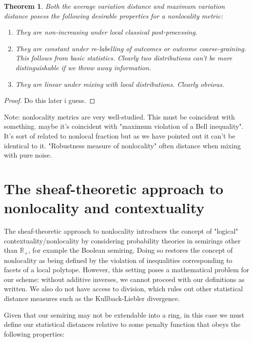 \documentclass{amsart}
\newtheorem{thm}{Theorem}
\theoremstyle{definition}
\begin{document}
\begin{thm}
Both the average variation distance and maximum variation distance posess the following desirable properties for a nonlocality metric:
\begin{enumerate} 
\item They are non-increasing under local classical post-processing.
\item They are constant under re-labelling of outcomes or outcome coarse-graining. This follows from basic statistics. Clearly two distributions can't be more distinguishable if we throw away information.
\item They are linear under mixing with local distributions. Clearly obvious.
\end{enumerate}
\end{thm}

\begin{proof}
Do this later i guess.

\end{proof}

Note: nonlocality metrics are very well-studied. This must be coincident with something. maybe it's coincident with "maximum violation of a Bell inequality". It's sort of related to nonlocal fraction but as we have pointed out it can't be identical to it. "Robustness measure of nonlocality" often distance when mixing with pure noise.

\section{The sheaf-theoretic approach to nonlocality and contextuality}

The sheaf-theoretic approach to nonlocality introduces the concept of "logical" contextuality/nonlocality by considering probability theories in semirings other than $\mathbb{R}_+$, for example the Boolean semiring. Doing so restores the concept of nonlocality as being defined by the violation of inequalities corresponding to facets of a local polytope. However, this setting poses a mathematical problem for our scheme: without additive inverses, we cannot proceed with our definitions as written. We also do not have access to division, which rules out other statistical distance measures such as the Kullback-Liebler divergence.

Given that our semiring may not be extendable into a ring, in this case we must define our statistical distances relative to some penalty function that obeys the following properties:
\end{document}
